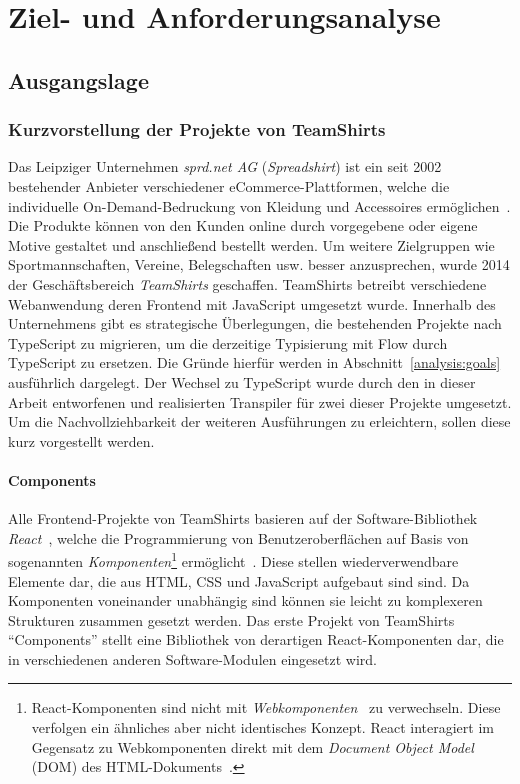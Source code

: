 \chapter{Ziel- und Anforderungsanalyse}
\label{chap:analysis}

\section{Ausgangslage}
\label{sec:status-quo}

\subsection{Kurzvorstellung der Projekte von TeamShirts}

Das Leipziger Unternehmen \textit{sprd.net AG} (\textit{Spreadshirt}) ist ein seit 2002 bestehender Anbieter verschiedener eCommerce-Plattformen, welche die individuelle On-Demand-Bedruckung von Kleidung und Accessoires ermöglichen~\autocite{SPREADSHIRT:ABOUT}. Die Produkte können von den Kunden online durch vorgegebene oder eigene Motive gestaltet und anschließend bestellt werden. Um weitere Zielgruppen wie Sportmannschaften, Vereine, Belegschaften usw. besser anzusprechen, wurde 2014 der Geschäftsbereich \textit{TeamShirts} geschaffen.
TeamShirts betreibt verschiedene Webanwendung deren Frontend mit JavaScript umgesetzt wurde. Innerhalb des Unternehmens gibt es strategische Überlegungen, die bestehenden Projekte nach TypeScript zu migrieren, um die derzeitige Typisierung mit Flow durch TypeScript zu ersetzen. Die Gründe hierfür werden in Abschnitt~\ref{analysis:goals} ausführlich dargelegt. Der Wechsel zu TypeScript wurde durch den in dieser Arbeit entworfenen und realisierten Transpiler für zwei dieser Projekte umgesetzt. Um die Nachvollziehbarkeit der weiteren Ausführungen zu erleichtern, sollen diese kurz vorgestellt werden.

\subsubsection{Components}

Alle Frontend-Projekte von TeamShirts basieren auf der Software-Bibliothek \textit{React}~\autocite{SOFTWARE:REACT}, welche die Programmierung von Benutzeroberflächen auf Basis von sogenannten \emph{Komponenten}\footnote{React-Komponenten sind nicht mit \textit{Webkomponenten}~\autocite{MDN:WEBCOMPONENTS} zu verwechseln. Diese verfolgen ein ähnliches aber nicht identisches Konzept. React interagiert im Gegensatz zu Webkomponenten direkt mit dem \textit{Document Object Model} (DOM) des HTML-Dokuments~\autocite{REACT:WEBCOMPONENTS}.} ermöglicht~\autocite{ACM:REACT}. Diese stellen wiederverwendbare Elemente dar, die aus HTML, CSS und JavaScript aufgebaut sind sind. Da Komponenten voneinander unabhängig sind können sie leicht zu komplexeren Strukturen zusammen gesetzt werden. Das erste Projekt von TeamShirts \enquote{Components} stellt eine Bibliothek von derartigen React-Komponenten dar, die in verschiedenen anderen Software-Modulen eingesetzt wird.

